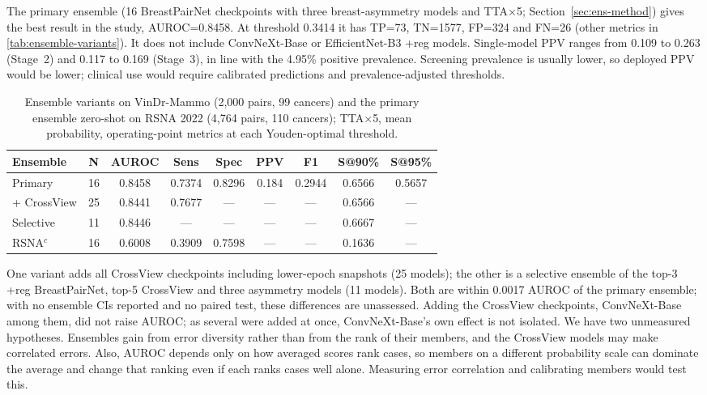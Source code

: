 \documentclass[conference]{IEEEtran}
\newcommand{\vindr}{VinDr-Mammo}
\newcommand{\rsna}{RSNA 2022}
\begin{document}
The primary ensemble (16 BreastPairNet checkpoints with three breast-asymmetry models and TTA$\times$5; Section~\ref{sec:ens-method}) gives the best result in the study, AUROC=0.8458. At threshold 0.3414 it has TP=73, TN=1577, FP=324 and FN=26 (other metrics in \autoref{tab:ensemble-variants}). It does not include ConvNeXt-Base or EfficientNet-B3 +reg models. Single-model PPV ranges from 0.109 to 0.263 (Stage~2) and 0.117 to 0.169 (Stage~3), in line with the 4.95\% positive prevalence. Screening prevalence is usually lower, so deployed PPV would be lower; clinical use would require calibrated predictions and prevalence-adjusted thresholds.

\begin{table}[!t]
\centering
\caption{Ensemble variants on \vindr{} (2,000 pairs, 99 cancers) and the primary ensemble zero-shot on \rsna{} (4,764 pairs, 110 cancers); TTA$\times$5, mean probability, operating-point metrics at each Youden-optimal threshold.}
\label{tab:ensemble-variants}
{\scriptsize\setlength{\tabcolsep}{1.4pt}%
\begin{tabular}{|l|c|c|c|c|c|c|c|c|}
\hline
\textbf{Ensemble} & \textbf{N} & \textbf{AUROC} & \textbf{Sens} & \textbf{Spec} & \textbf{PPV} & \textbf{F1} & \textbf{S@90\%} & \textbf{S@95\%} \\
\hline
Primary & 16 & 0.8458 & 0.7374 & 0.8296 & 0.184 & 0.2944 & 0.6566 & 0.5657 \\
\hline
+ CrossView & 25 & 0.8441 & 0.7677 & --- & --- & --- & 0.6566 & --- \\
\hline
Selective & 11 & 0.8446 & --- & --- & --- & --- & 0.6667 & --- \\
\hline
RSNA$^{c}$ & 16 & 0.6008 & 0.3909 & 0.7598 & --- & --- & 0.1636 & --- \\
\hline
\end{tabular}}
\par{}
\end{table}

One variant adds all CrossView checkpoints including lower-epoch snapshots (25 models); the other is a selective ensemble of the top-3 +reg BreastPairNet, top-5 CrossView and three asymmetry models (11 models). Both are within 0.0017 AUROC of the primary ensemble; with no ensemble CIs reported and no paired test, these differences are unassessed. Adding the CrossView checkpoints, ConvNeXt-Base among them, did not raise AUROC; as several were added at once, ConvNeXt-Base's own effect is not isolated. We have two unmeasured hypotheses. Ensembles gain from error diversity rather than from the rank of their members, and the CrossView models may make correlated errors. Also, AUROC depends only on how averaged scores rank cases, so members on a different probability scale can dominate the average and change that ranking even if each ranks cases well alone. Measuring error correlation and calibrating members would test this.
\end{document}
